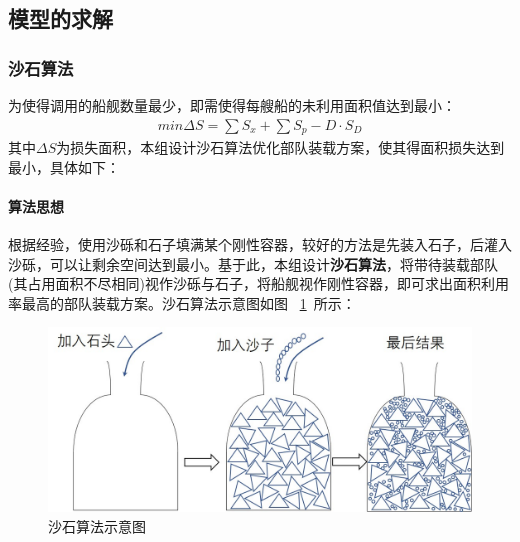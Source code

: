 \documentclass{whutmod}
\begin{document}
    		    	
	\subsection{模型的求解}   
    	  \subsubsection{沙石算法}

		为使得调用的船舰数量最少，即需使得每艘船的未利用面积值达到最小：
	    \begin{gather}
		min \Delta S= \sum  S_{x} + \sum  S_{p}-D\cdot S_{D} 
		\end{gather}
	其中$\Delta S$为损失面积，本组设计沙石算法优化部队装载方案，使其得面积损失达到最小，具体如下：
	 \paragraph{算法思想}
	 根据经验，使用沙砾和石子填满某个刚性容器，较好的方法是先装入石子，后灌入沙砾，可以让剩余空间达到最小。基于此，本组设计\textbf{沙石算法}，将带待装载部队(其占用面积不尽相同)视作沙砾与石子，将船舰视作刚性容器，即可求出面积利用率最高的部队装载方案。沙石算法示意图如图 ~\ref{shashi}~所示：
	 
	 
	 \begin{figure}[H]
	 	\centering
	 	\includegraphics[width=.8\textwidth]{figures/shashi.jpg}
	 	\caption{沙石算法示意图}\label{shashi}
	 \end{figure}
	 
\end{document}
